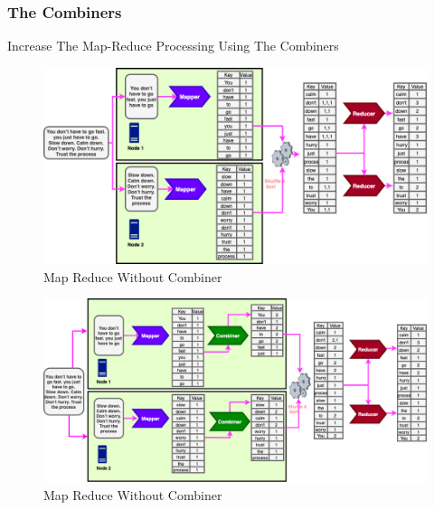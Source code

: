 \begin{frame}[c]{ }
	\frametitle{ The Combiners}
	\centering     
	
	\textcolor{offgreen}{ \large Increase The Map-Reduce Processing Using The Combiners}
\end{frame}
\begin{frame}
	
	\begin{figure}
		\includegraphics[height=.85\textheight]{./Figures/chapter-02/map-reduce-combiner-ex-1.png}
		\caption{Map Reduce Without Combiner } \label{fig:MRCombiner1}
	\end{figure}			
\end{frame}
\begin{frame}
	
	\begin{figure}
		\includegraphics[height=.85\textheight]{./Figures/chapter-02/map-reduce-combiner-ex-2.png}
		\caption{Map Reduce Without Combiner } \label{fig:MRCombiner2}
	\end{figure}			
\end{frame}

